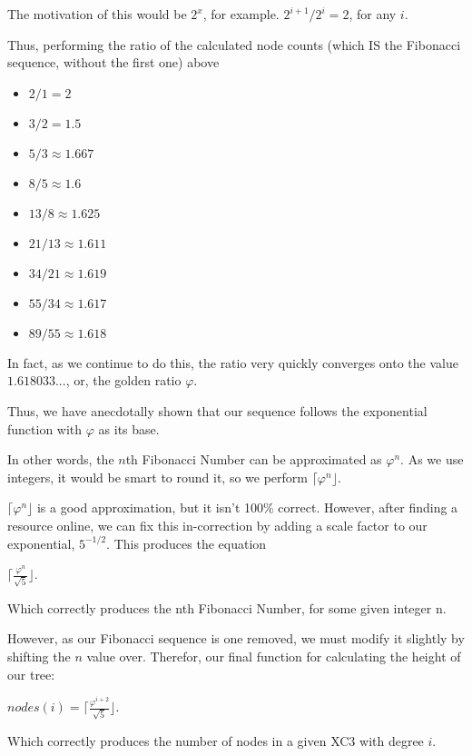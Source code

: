 \documentclass{article}
\begin{document}
The motivation of this would be $2^x$, for example. $2^{i+1} / 2^{i} = 2$, for any $i$.

Thus, performing the ratio of the calculated node counts (which IS the Fibonacci sequence, without the first one) above

\begin{itemize}
    \item $2 / 1 = 2$
    \item $3 / 2 = 1.5$
    \item $5 / 3 \approx 1.667$
    \item $8 / 5 \approx 1.6$
    \item $13 / 8 \approx 1.625$
    \item $21 / 13 \approx 1.611$
    \item $34 / 21 \approx 1.619$
    \item $55 / 34 \approx 1.617$
    \item $89 / 55 \approx 1.618$
\end{itemize}

In fact, as we continue to do this, the ratio very quickly converges onto the value $1.618033...$, or, the golden ratio $\varphi$.

Thus, we have anecdotally shown that our sequence follows the exponential function with $\varphi$ as its base.

In other words, the $n$th Fibonacci Number can be approximated as $\varphi^{n}$. As we use integers, it would be smart to round it, so we perform $\lceil \varphi^{n} \rfloor$.

$\lceil \varphi^{n} \rfloor$ is a good approximation, but it isn't 100\% correct. However, after finding a resource online, we can fix this in-correction by adding a scale factor to our exponential, $5^{-1/2}$. This produces the equation

{
\Large
\begin{center}
    $\lceil \frac{\varphi^{n}}{\sqrt{5}} \rfloor$.\\
    $ $
\end{center}
}
Which correctly produces the nth Fibonacci Number, for some given integer n.

However, as our Fibonacci sequence is one removed, we must modify it slightly by shifting the $n$ value over. Therefor, our final function for calculating the height of our tree:


{
\Large
\begin{center}
    $nodes(i) = \lceil \frac{\varphi^{i+2}}{\sqrt{5}} \rfloor$.\\
    $ $
\end{center}
}
Which correctly produces the number of nodes in a given XC3 with degree $i$.
\end{document}
